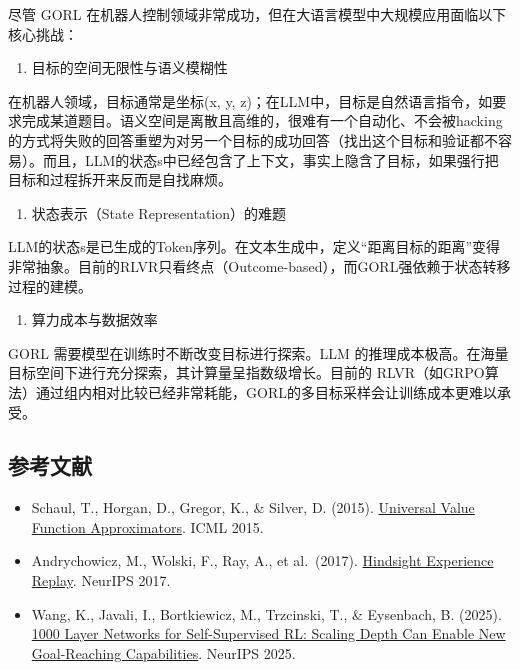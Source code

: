 尽管 GORL 在机器人控制领域非常成功，但在大语言模型中大规模应用面临以下核心挑战：

\begin{enumerate}
\def\labelenumi{\arabic{enumi}.}
\tightlist
\item
  目标的空间无限性与语义模糊性
\end{enumerate}

在机器人领域，目标通常是坐标(x, y, z)；在LLM中，目标是自然语言指令，如要求完成某道题目。语义空间是离散且高维的，很难有一个自动化、不会被hacking的方式将失败的回答重塑为对另一个目标的成功回答（找出这个目标和验证都不容易）。而且，LLM的状态s中已经包含了上下文，事实上隐含了目标，如果强行把目标和过程拆开来反而是自找麻烦。

\begin{enumerate}
\def\labelenumi{\arabic{enumi}.}
\setcounter{enumi}{1}
\tightlist
\item
  状态表示（State Representation）的难题
\end{enumerate}

LLM的状态s是已生成的Token序列。在文本生成中，定义``距离目标的距离''变得非常抽象。目前的RLVR只看终点（Outcome-based），而GORL强依赖于状态转移过程的建模。

\begin{enumerate}
\def\labelenumi{\arabic{enumi}.}
\setcounter{enumi}{2}
\tightlist
\item
  算力成本与数据效率
\end{enumerate}

GORL 需要模型在训练时不断改变目标进行探索。LLM 的推理成本极高。在海量目标空间下进行充分探索，其计算量呈指数级增长。目前的 RLVR（如GRPO算法）通过组内相对比较已经非常耗能，GORL的多目标采样会让训练成本更难以承受。

\hypertarget{ux53c2ux8003ux6587ux732e-66}{%
\subsection{参考文献}\label{ux53c2ux8003ux6587ux732e-66}}

\vspace{0.25em}
\begin{itemize}
\tightlist
\item
  Schaul, T., Horgan, D., Gregor, K., \& Silver, D. (2015). \href{https://proceedings.mlr.press/v37/schaul15.html}{Universal Value Function Approximators}. ICML 2015.
\item
  Andrychowicz, M., Wolski, F., Ray, A., et al.~(2017). \href{https://arxiv.org/abs/1707.01495}{Hindsight Experience Replay}. NeurIPS 2017.
\item
  Wang, K., Javali, I., Bortkiewicz, M., Trzcinski, T., \& Eysenbach, B. (2025). \href{https://proceedings.neurips.cc/paper_files/paper/2025/hash/e74ee34cc0f2d0780f34ee77d8fba25b-Abstract-Conference.html}{1000 Layer Networks for Self-Supervised RL: Scaling Depth Can Enable New Goal-Reaching Capabilities}. NeurIPS 2025.
\end{itemize}

\clearpage
